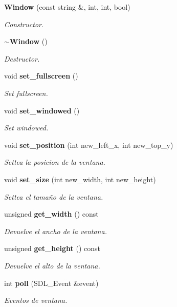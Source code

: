 \begin{DoxyCompactItemize}
\item 
\textbf{ Window} (const string \&, int, int, bool)
\begin{DoxyCompactList}\small\item\em Constructor. \end{DoxyCompactList}\item 
\textbf{ $\sim$\+Window} ()
\begin{DoxyCompactList}\small\item\em Destructor. \end{DoxyCompactList}\item 
void \textbf{ set\+\_\+fullscreen} ()
\begin{DoxyCompactList}\small\item\em Set fullscreen. \end{DoxyCompactList}\item 
void \textbf{ set\+\_\+windowed} ()
\begin{DoxyCompactList}\small\item\em Set windowed. \end{DoxyCompactList}\item 
void \textbf{ set\+\_\+position} (int new\+\_\+left\+\_\+x, int new\+\_\+top\+\_\+y)
\begin{DoxyCompactList}\small\item\em Settea la posicion de la ventana. \end{DoxyCompactList}\item 
void \textbf{ set\+\_\+size} (int new\+\_\+width, int new\+\_\+height)
\begin{DoxyCompactList}\small\item\em Settea el tamaño de la ventana. \end{DoxyCompactList}\item 
unsigned \textbf{ get\+\_\+width} () const
\begin{DoxyCompactList}\small\item\em Devuelve el ancho de la ventana. \end{DoxyCompactList}\item 
unsigned \textbf{ get\+\_\+height} () const
\begin{DoxyCompactList}\small\item\em Devuelve el alto de la ventana. \end{DoxyCompactList}\item 
int \textbf{ poll} (S\+D\+L\+\_\+\+Event \&event)
\begin{DoxyCompactList}\small\item\em Eventos de ventana. \end{DoxyCompactList}\item 

\end{DoxyCompactItemize}
